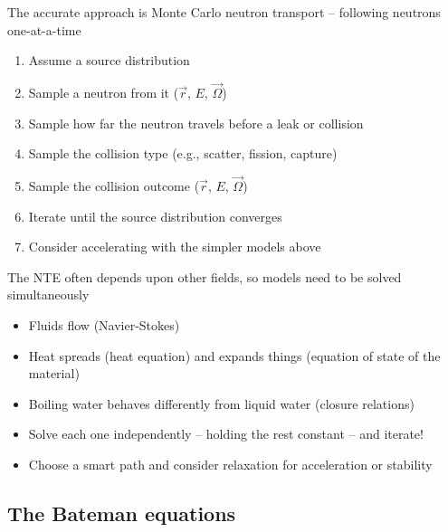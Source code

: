 \documentclass{beamer}
\begin{document}
        \begin{frame}{The accurate approach is Monte Carlo neutron transport -- following neutrons one-at-a-time}
            \begin{enumerate}
                \item Assume a source distribution
                \pause
                \item Sample a neutron from it ($\vec r$, $E$, $\vec\Omega$)
                \pause
                \item Sample how far the neutron travels before a leak or collision
                \pause
                \item Sample the collision type (e.g., scatter, fission, capture)
                \pause
                \item Sample the collision outcome ($\vec r$, $E$, $\vec\Omega$)
                \pause
                \item Iterate until the source distribution converges
                \pause
                \item Consider accelerating with the simpler models above
            \end{enumerate}
        \end{frame}

        \begin{frame}{The NTE often depends upon other fields, so models need to be solved simultaneously}
            \begin{itemize}
                \item Fluids flow (Navier-Stokes)
                \pause
                \item Heat spreads (heat equation) and expands things (equation of state of the material)
                \pause
                \item Boiling water behaves differently from liquid water (closure relations)
                \pause
                \item Solve each one independently  -- holding the rest constant -- and iterate!
                \pause
                \item Choose a smart path and consider relaxation for acceleration or stability
            \end{itemize}
        \end{frame}

    \subsection{The Bateman equations}
\end{document}
